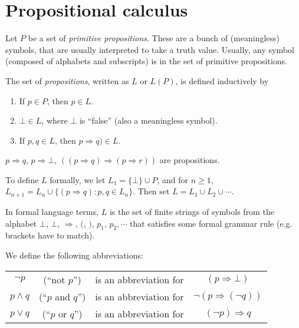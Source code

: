 \documentclass[a4paper]{article}
\begin{document}
\tableofcontents

\section{Propositional calculus}
\begin{defi}[Propositions]
  Let $P$ be a set of \emph{primitive propositions}. These are a bunch of (meaningless) symbols, that are usually interpreted to take a truth value. Usually, any symbol (composed of alphabets and subscripts) is in the set of primitive propositions.

  The set of \emph{propositions}, written as $L$ or $L(P)$, is defined inductively by
  \begin{enumerate}
    \item If $p\in P$, then $p\in L$.
    \item $\bot\in L$, where $\bot$ is ``false'' (also a meaningless symbol).
    \item If $p, q\in L$, then $p\Rightarrow q)\in L$.
  \end{enumerate}
\end{defi}

\begin{eg}
  $p\Rightarrow q$, $p\Rightarrow \bot$, $((p\Rightarrow q)\Rightarrow (p\Rightarrow r))$ are propositions.
\end{eg}

To define $L$ formally, we let $L_1 = \{\bot\}\cup P$, and for $n\geq 1$, $L_{n + 1} = L_n\cup \{(p\Rightarrow q): p, q\in L_n\}$. Then set $L = L_1\cup L_2\cup \cdots$.

In formal language terms, $L$ is the set of finite strings of symbols from the alphabet $\bot$, $\bot$, $\Rightarrow $, $($, $)$, $p_1$, $p_2, \cdots$ that satisfies some formal grammar rule (e.g. brackets have to match).

We define the following abbreviations:
\begin{defi}\leavevmode
  \begin{center}
    \begin{tabular}[]{cccc}
      $\neg p$ & (``not $p$'') & is an abbreviation for & $(p\Rightarrow \bot)$\\
      $p\wedge q$ & (``$p$ and $q$'') & is an abbreviation for & $\neg(p\Rightarrow (\neg q))$\\
      $p\vee q$ & (``$p$ or $q$'') & is an abbreviation for & $(\neg p)\Rightarrow q$
    \end{tabular}
  \end{center}
\end{defi}
\end{document}
